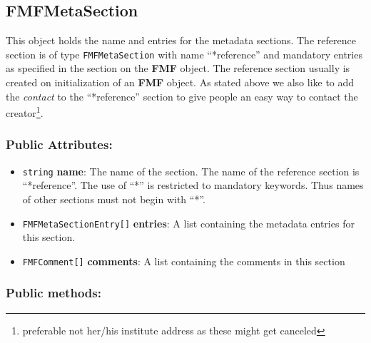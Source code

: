\documentclass[10pt,utf8, mainlanguage=english]{ufcd-info}
\newcommand{\fret}[1]{{\texttt{#1}}}
\newcommand{\fmfattr}[1]{{\textbf{#1}}}
\newcommand{\fmfobj}[1]{{\textbf{\textsf{#1}}}}
\begin{document}
\subsection{FMFMetaSection}\label{subsec:FMFMeta}

This object holds the name and entries for the metadata sections. The reference section is of type \fret{FMFMetaSection} with name \enquote{*reference} and mandatory entries as specified in the section on the \fmfobj{FMF} object. The reference section usually is created on initialization of an \fmfobj{FMF} object. As stated above we also like to add the \textit{contact} to the \enquote{*reference} section to give people an easy way to contact the creator\footnote{preferable not her/his institute address as these might get canceled}.  

\subsubsection{Public Attributes:}
\begin{itemize}
	\item \fret{string} \fmfattr{name}: The name of the section. The name of the reference section is \enquote{*reference}. The use of \enquote{*} is restricted to mandatory keywords. Thus names of other sections must not begin with \enquote{*}.

	\item \fret{FMFMetaSectionEntry[]} \fmfattr{entries}: A list containing the metadata entries for this section.

	\item \fret{FMFComment[]} \fmfattr{comments}: A list containing the comments in this section
\end{itemize}

\subsubsection{Public methods:}
\end{document}

